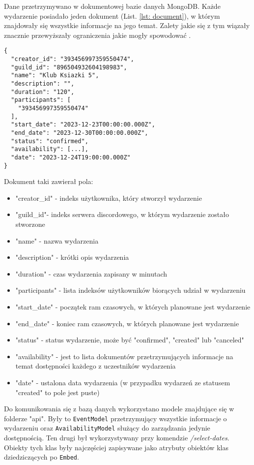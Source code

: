 \documentclass[11pt,a4paper]{article}
\newcommand{\classname}[1]{\texttt{#1}}
\begin{document}

Dane przetrzymywano w dokumentowej bazie danych MongoDB. Każde wydarzenie posiadało jeden dokument (List. \ref{lst: document}), w którym znajdowały się wszystkie informacje na jego temat. Zalety jakie się z tym wiązały znacznie przewyższały ograniczenia jakie mogły spowodować \cite{MongoBestPractice}.

\begin{lstlisting}[caption={Przykładowy dokument w bazie danych},label={lst: document}]
{
  "creator_id": "393456997359550474",
  "guild_id": "896504932604198983",
  "name": "Klub Ksiazki 5",
  "description": "",
  "duration": "120",
  "participants": [
    "393456997359550474"
  ],
  "start_date": "2023-12-23T00:00:00.000Z",
  "end_date": "2023-12-30T00:00:00.000Z",
  "status": "confirmed",
  "availability": [...],
  "date": "2023-12-24T19:00:00.000Z"
}
\end{lstlisting}

Dokument taki zawierał pola:
\begin{itemize}
    \item "creator\_id" - indeks użytkownika, który stworzył wydarzenie
    \item "guild\_id"- indeks serwera discordowego, w którym wydarzenie zostało stworzone
    \item "name" - nazwa wydarzenia
    \item "description" - krótki opis wydarzenia
    \item "duration" - czas wydarzenia zapisany w minutach
    \item "participants" - lista indeksów użytkowników biorących udział w wydarzeniu
    \item "start\_date" - początek ram czasowych, w których planowane jest wydarzenie
    \item "end\_date" - koniec ram czasowych, w których planowane jest wydarzenie
    \item "status" - status wydarzenie, może być "confirmed", "created" lub "canceled"
    \item "availability" - jest to lista dokumentów przetrzymujących informacje na temat dostępności każdego z uczestników wydarzenia
    \item "date" - ustalona data wydarzenia (w przypadku wydarzeń ze statusem "created" to pole jest puste)
\end{itemize}

Do komunikowania się z bazą danych wykorzystano modele znajdujące się w folderze "api". Były to \classname{EventModel} przetrzymujący wszystkie informacje o wydarzeniu oraz \classname{AvailabilityModel} służący do zarządzania jedynie dostępnością. Ten drugi był wykorzystywany przy komendzie \textit{/select-dates}. Obiekty tych klas były najczęściej zapisywane jako atrybuty obiektów klas dziedziczących po \classname{Embed}.
\end{document}
